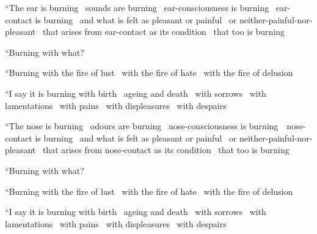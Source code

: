 \begin{english-only-hang}
  ``The ear is burning \breathmark\ sounds are burning \breathmark\ ear-consciousness is burning \breathmark\ ear-contact is burning \breathmark\ and what is felt as pleasant or painful \breathmark\ or neither-painful-nor-pleasant \breathmark\ that arises from ear-contact as its condition \breathmark\ that too is burning
\end{english-only-hang}
\begin{english-only-hangtogether}
  ``Burning with what?
\end{english-only-hangtogether}
\begin{english-only-hangtogether}
  ``Burning with the fire of lust \breathmark\ with the fire of hate \breathmark\ with the fire of delusion
\end{english-only-hangtogether}
\begin{english-only-hangtogether}
  ``I say it is burning with birth \breathmark\ ageing and death \breathmark\ with sorrows \breathmark\ with lamentations \breathmark\ with pains \breathmark\ with displeasures \breathmark\ with despairs
\end{english-only-hangtogether}

\begin{english-only-hang}
  ``The nose is burning \breathmark\ odours are burning \breathmark\ nose-consciousness is \mbox{burning}~\breathmark\ nose-contact is burning \breathmark\ and what is felt as pleasant or painful \breathmark\ or neither-painful-nor-pleasant \breathmark\ that arises from nose-contact as its condition \breathmark\ that too is burning
\end{english-only-hang}
\begin{english-only-hangtogether}
  ``Burning with what?
\end{english-only-hangtogether}
\begin{english-only-hangtogether}
  ``Burning with the fire of lust \breathmark\ with the fire of hate \breathmark\ with the fire of delusion
\end{english-only-hangtogether}
\begin{english-only-hangtogether}
  ``I say it is burning with birth \breathmark\ ageing and death \breathmark\ with sorrows \breathmark\ with lamentations \breathmark\ with pains \breathmark\ with displeasures \breathmark\ with despairs
\end{english-only-hangtogether}

